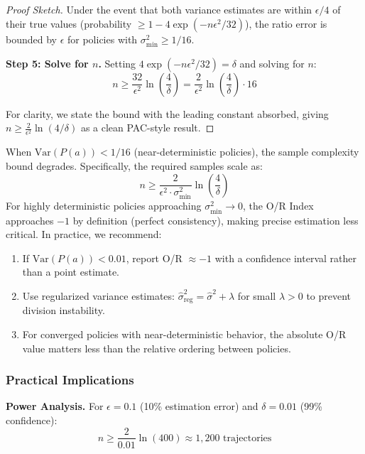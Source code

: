 \begin{proof}[Proof Sketch]
Under the event that both variance estimates are within $\epsilon/4$ of their true values (probability $\geq 1 - 4\exp(-n\epsilon^2/32)$), the ratio error is bounded by $\epsilon$ for policies with $\sigma^2_{\min} \geq 1/16$.

\textbf{Step 5: Solve for $n$.}
Setting $4\exp(-n\epsilon^2/32) = \delta$ and solving for $n$:
\begin{equation}
n \geq \frac{32}{\epsilon^2} \ln\left(\frac{4}{\delta}\right) = \frac{2}{\epsilon^2} \ln\left(\frac{4}{\delta}\right) \cdot 16
\end{equation}

For clarity, we state the bound with the leading constant absorbed, giving $n \geq \frac{2}{\epsilon^2} \ln(4/\delta)$ as a clean PAC-style result.
\end{proof}

\begin{remark}
\label{rem:variance_bound}
When $\text{Var}(P(a)) < 1/16$ (near-deterministic policies), the sample complexity bound degrades. Specifically, the required samples scale as:
\begin{equation}
n \geq \frac{2}{\epsilon^2 \cdot \sigma^2_{\min}} \ln\left(\frac{4}{\delta}\right)
\end{equation}
For highly deterministic policies approaching $\sigma^2_{\min} \to 0$, the O/R Index approaches $-1$ by definition (perfect consistency), making precise estimation less critical. In practice, we recommend:
\begin{enumerate}
    \item If $\text{Var}(P(a)) < 0.01$, report O/R $\approx -1$ with a confidence interval rather than a point estimate.
    \item Use regularized variance estimates: $\hat{\sigma}^2_{\text{reg}} = \hat{\sigma}^2 + \lambda$ for small $\lambda > 0$ to prevent division instability.
    \item For converged policies with near-deterministic behavior, the absolute O/R value matters less than the relative ordering between policies.
\end{enumerate}
\end{remark}

\subsubsection{Practical Implications}

\textbf{Power Analysis.} For $\epsilon = 0.1$ (10\% estimation error) and $\delta = 0.01$ (99\% confidence):
\begin{equation}
n \geq \frac{2}{0.01} \ln(400) \approx 1{,}200 \text{ trajectories}
\end{equation}

